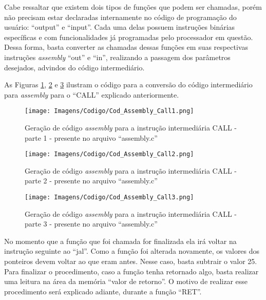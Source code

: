\documentclass[
	12pt,				%
	oneside,
	a4paper,			%
	english,			%
	french,				%
	spanish,			%
	brazil,				%
	]{abntex2}
\begin{document}
Cabe ressaltar que existem dois tipos de funções que podem ser chamadas, porém não precisam estar declaradas internamente no código de programação do usuário: ``output'' e ``input''. Cada uma delas possuem instruções binárias específicas e com funcionalidades já programadas pelo processador em questão. Dessa forma, basta converter as chamadas dessas funções em suas respectivas instruções \emph{assembly} ``out'' e ``in'', realizando a passagem dos parâmetros desejados, advindos do código intermediário. 

As Figuras \ref{fig:AssemblyCALL1}, \ref{fig:AssemblyCALL2} e \ref{fig:AssemblyCALL3} ilustram o código para a conversão do código intermediário para \emph{assembly} para o ``CALL'' explicado anteriormente.

\begin{figure}[H]
\centering 
\caption{Geração de código \emph{assembly} para a instrução intermediária CALL - parte 1 - presente no arquivo ``assembly.c''} \label{fig:AssemblyCALL1}
\graphicspath{ {./Imagens/} } 
\texttt{[image: Imagens/Codigo/Cod\_Assembly\_Call1.png]}
\end{figure}

\begin{figure}[H]
\centering 
\caption{Geração de código \emph{assembly} para a instrução intermediária CALL - parte 2 - presente no arquivo ``assembly.c''} \label{fig:AssemblyCALL2}
\graphicspath{ {./Imagens/} } 
\texttt{[image: Imagens/Codigo/Cod\_Assembly\_Call2.png]}
\end{figure}

\begin{figure}[H]
\centering 
\caption{Geração de código \emph{assembly} para a instrução intermediária CALL - parte 3 - presente no arquivo ``assembly.c''} \label{fig:AssemblyCALL3}
\graphicspath{ {./Imagens/} } 
\texttt{[image: Imagens/Codigo/Cod\_Assembly\_Call3.png]}
\end{figure}


No momento que a função que foi chamada for finalizada ela irá voltar na instrução seguinte ao ``jal''. Como a função foi alterada novamente, os valores dos ponteiros devem voltar ao que eram antes. Nesse caso, basta subtrair o valor 25. Para finalizar o procedimento, caso a função tenha retornado algo, basta realizar uma leitura na área da memória ``valor de retorno''. O motivo de realizar esse procedimento será explicado adiante, durante a função ``RET''.
\end{document}
